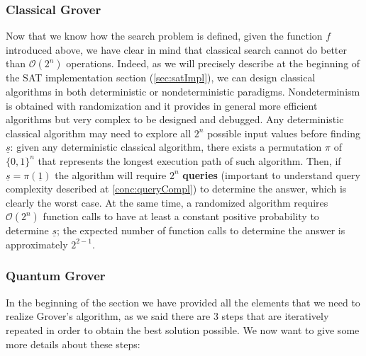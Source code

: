 \documentclass[english]{article}
\begin{document}
			\subsubsection{Classical Grover}
			\label{sec:groverClass}
				Now that we know how the search problem is defined, given the function $f$ introduced above, we have clear in mind that classical search cannot do better than $\mathcal{O}(2^n)$ operations. Indeed, as we will precisely describe at the beginning of the SAT implementation section (\ref{sec:satImpl}), we can design classical algorithms in both deterministic or nondeterministic paradigms. Nondeterminism is obtained with randomization and it provides in general more efficient algorithms but very complex to be designed and debugged. Any deterministic classical algorithm may need to explore all $2^n$ possible input values before finding $\underline{s}$: given any deterministic classical algorithm, there exists a permutation $\pi$ of $\{0,1\}^n$ that represents the longest execution path of such algorithm. Then, if $\underline{s} = \pi(\underline{1})$ the algorithm will require $2^n$ \textbf{queries} (important to understand query complexity described at \ref{conc:queryCompl}) to determine the answer, which is clearly the worst case. At the same time, a randomized algorithm requires $\mathcal{O}(2^n)$ function calls to have at least a constant positive probability to determine $\underline{s}$; the expected number of function calls to determine the answer is approximately $2^{2-1}$.
			
			\subsubsection{Quantum Grover}
			\label{sec:groverQuant}
				In the beginning of the section we have provided all the elements that we need to realize Grover's algorithm, as we said there are 3 steps that are iteratively repeated in order to obtain the best solution possible. We now want to give some more details about these steps:
				
\end{document}
